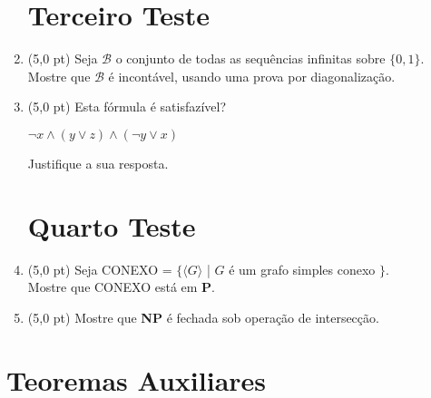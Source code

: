 \documentclass[12pt,a4paper,oneside]{article}
\begin{document}
\begin{enumerate}
	
	\section*{Terceiro Teste}
	
	\item (5,0 pt) Seja $\mathcal{B}$ o conjunto de todas as sequências infinitas sobre $\{0,1\}$. Mostre que $\mathcal{B}$ é
incontável, usando uma prova por diagonalização.
	
	\item (5,0 pt) Esta fórmula é satisfazível?
		\begin{center}
			$ \neg x \wedge (y \vee z) \wedge (\neg y \vee x)$
		\end{center}
		Justifique a sua resposta.
		
	
	\section*{Quarto Teste}
	
	\item (5,0 pt) Seja CONEXO = $\{ \langle G \rangle$ | $G$ é um grafo simples conexo $\}$. \\Mostre que CONEXO está em {\bf P}.
	
	\item (5,0 pt) Mostre que {\bf NP} é fechada sob operação de intersecção.
	
\end{enumerate}

\section*{Teoremas Auxiliares}
\end{document}
